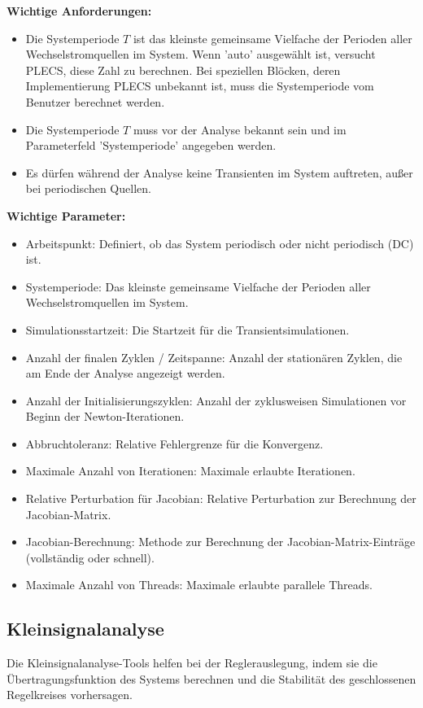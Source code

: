 \documentclass[a4paper,11pt,oneside]{article}
\begin{document}
\textbf{Wichtige Anforderungen:}
\begin{itemize}
	\item Die Systemperiode $T$ ist das kleinste gemeinsame Vielfache der Perioden aller Wechselstromquellen im System. Wenn 'auto' ausgewählt ist, versucht PLECS, diese Zahl zu berechnen. Bei speziellen Blöcken, deren Implementierung PLECS unbekannt ist, muss die Systemperiode vom Benutzer berechnet werden.
	\item Die Systemperiode $T$ muss vor der Analyse bekannt sein und im Parameterfeld 'Systemperiode' angegeben werden.
	\item Es dürfen während der Analyse keine Transienten im System auftreten, außer bei periodischen Quellen.
\end{itemize}

\textbf{Wichtige Parameter:}
\begin{itemize}
	\item Arbeitspunkt: Definiert, ob das System periodisch oder nicht periodisch (DC) ist.
	\item Systemperiode: Das kleinste gemeinsame Vielfache der Perioden aller Wechselstromquellen im System.
	\item Simulationsstartzeit: Die Startzeit für die Transientsimulationen.
	\item Anzahl der finalen Zyklen / Zeitspanne: Anzahl der stationären Zyklen, die am Ende der Analyse angezeigt werden.
	\item Anzahl der Initialisierungszyklen: Anzahl der zyklusweisen Simulationen vor Beginn der Newton-Iterationen.
	\item Abbruchtoleranz: Relative Fehlergrenze für die Konvergenz.
	\item Maximale Anzahl von Iterationen: Maximale erlaubte Iterationen.
	\item Relative Perturbation für Jacobian: Relative Perturbation zur Berechnung der Jacobian-Matrix.
	\item Jacobian-Berechnung: Methode zur Berechnung der Jacobian-Matrix-Einträge (vollständig oder schnell).
	\item Maximale Anzahl von Threads: Maximale erlaubte parallele Threads.
\end{itemize}

\subsection{Kleinsignalanalyse}
Die Kleinsignalanalyse-Tools helfen bei der Reglerauslegung, indem sie die Übertragungsfunktion des Systems berechnen und die Stabilität des geschlossenen Regelkreises vorhersagen.
\end{document}
